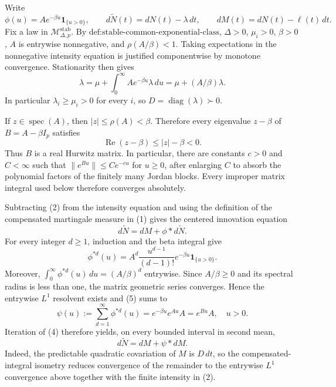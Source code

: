 Write
\[
 \phi(u)=Ae^{-\beta u}\mathbf 1_{\{u>0\}},\qquad
 d\widetilde N(t)=dN(t)-\lambda\,dt,\qquad
 dM(t)=dN(t)-\ell(t)\,dt.
\tag{1}
\]
Fix a law in \(\mathcal M_{\Delta,p}^{\mathrm{stab}}\).  By \(\text{def:stable-common-exponential-class}\), \(\Delta>0\), \(\mu_i>0\), \(\beta>0\), \(A\) is entrywise nonnegative, and \(\rho(A/\beta)<1\).  Taking expectations in the nonnegative intensity equation is justified componentwise by monotone convergence.  Stationarity then gives
\[
 \lambda=\mu+\int_0^\infty Ae^{-\beta u}\lambda\,du
 =\mu+(A/\beta)\lambda.
\tag{2}
\]
In particular \(\lambda_i\geq\mu_i>0\) for every \(i\), so
\(D=\operatorname{diag}(\lambda)\succ0\).

If \(z\in\operatorname{spec}(A)\), then \(|z|\leq\rho(A)<\beta\).  Therefore every eigenvalue \(z-\beta\) of \(B=A-\beta I_p\) satisfies
\[
 \operatorname{Re}(z-\beta)\leq |z|-\beta<0.
\tag{3}
\]
Thus \(B\) is a real Hurwitz matrix.  In particular, there are constants \(c>0\) and \(C<\infty\) such that \(\|e^{Bu}\|\leq Ce^{-cu}\) for \(u\geq0\), after enlarging \(C\) to absorb the polynomial factors of the finitely many Jordan blocks.  Every improper matrix integral used below therefore converges absolutely.

Subtracting (2) from the intensity equation and using the definition of the compensated martingale measure in (1) gives the centered innovation equation
\[
 d\widetilde N=dM+\phi*d\widetilde N.
\tag{4}
\]
For every integer \(d\geq1\), induction and the beta integral give
\[
 \phi^{*d}(u)
 =A^d\frac{u^{d-1}}{(d-1)!}e^{-\beta u}\mathbf 1_{\{u>0\}}.
\tag{5}
\]
Moreover, \(\int_0^\infty\phi^{*d}(u)\,du=(A/\beta)^d\) entrywise.  Since \(A/\beta\geq0\) and its spectral radius is less than one, the matrix geometric series converges.  Hence the entrywise \(L^1\) resolvent exists and (5) sums to
\[
 \psi(u):=\sum_{d=1}^{\infty}\phi^{*d}(u)
 =e^{-\beta u}e^{Au}A=e^{Bu}A,\quad u>0.
\tag{6}
\]
Iteration of (4) therefore yields, on every bounded interval in second mean,
\[
 d\widetilde N=dM+\psi*dM.
\tag{7}
\]
Indeed, the predictable quadratic covariation of \(M\) is \(D\,dt\), so the compensated-integral isometry reduces convergence of the remainder to the entrywise \(L^1\) convergence above together with the finite intensity in (2).

